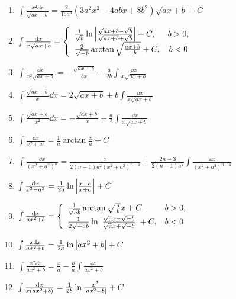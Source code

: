 \begin{enumerate}
\item \(\int \frac{x^2 \dd{x}}{\sqrt{ax+b}} = \frac{2}{15a^3} (3a^2x^2-4abx+8b^2) \sqrt{ax+b} + C\)

\item \(\int \frac{\dd{x}}{x \sqrt{ax+b}} = \left\{ \begin{array}{lc}
\frac{1}{\sqrt{b}} \ln\abs{\frac{\sqrt{ax+b}-\sqrt{b}}{\sqrt{ax+b}+\sqrt{b}}} + C, & b>0, \\
\frac{2}{\sqrt{-b}} \arctan\sqrt{\frac{ax+b}{-b}} + C, & b<0
\end{array} \right.\)

\item \(\int \frac{\dd{x}}{x^2 \sqrt{ax+b}} = -\frac{\sqrt{ax+b}}{bx} - \frac{a}{2b} \int \frac{\dd{x}}{x \sqrt{ax+b}}\)

\item \(\int \frac{\sqrt{ax+b}}{x} \dd{x} = 2\sqrt{ax+b} + b \int \frac{\dd{x}}{x \sqrt{ax+b}}\)

\item \(\int \frac{\sqrt{ax+b}}{x^2} \dd{x} = -\frac{\sqrt{ax+b}}{x} + \frac{a}{2} \int \frac{\dd{x}}{x \sqrt{ax+b}}\)

\item \(\int \frac{\dd{x}}{x^2+a^2} = \frac{1}{a} \arctan\frac{x}{a} + C\)

\item \(\int \frac{\dd{x}}{(x^2+a^2)^n} = \frac{x}{2(n-1)a^2(x^2+a^2)^{n-1}} + \frac{2n-3}{2(n-1)a^2} \int \frac{\dd{x}}{(x^2+a^2)^{n-1}}\)

\item \(\int \frac{\dd{x}}{x^2-a^2} = \frac{1}{2a} \ln\abs{\frac{x-a}{x+a}} + C\)

\item \(\int \frac{\dd{x}}{ax^2+b} = \left\{ \begin{array}{ll}
\frac{1}{\sqrt{ab}} \arctan\sqrt{\frac{a}{b}}x + C, & b>0, \\
\frac{1}{2\sqrt{-ab}} \ln\abs{\frac{\sqrt{a}x - \sqrt{-b}}{\sqrt{a}x + \sqrt{-b}}} + C, & b<0
\end{array} \right.\)

\item \(\int \frac{x \dd{x}}{ax^2+b} = \frac{1}{2a} \ln\abs{ax^2+b} + C\)

\item \(\int \frac{x^2 \dd{x}}{ax^2+b} = \frac{x}{a} - \frac{b}{a} \int \frac{\dd{x}}{ax^2+b}\)

\item \(\int \frac{\dd{x}}{x(ax^2+b)} = \frac{1}{2b} \ln\frac{x^2}{\abs{ax^2+b}} + C\)


\end{enumerate}

